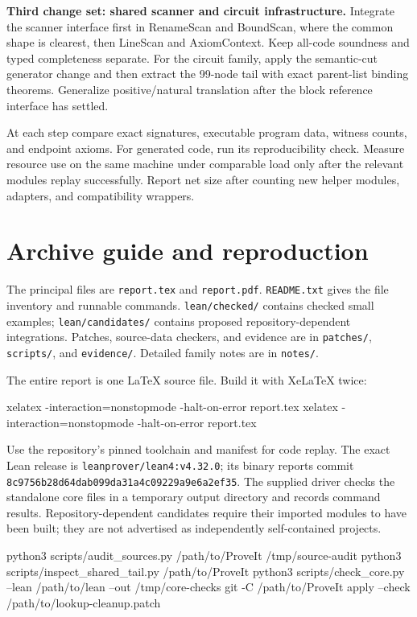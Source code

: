\documentclass[11pt,letterpaper]{article}
\newcommand{\code}[1]{\nolinkurl{#1}}
\begin{document}
\textbf{Third change set: shared scanner and circuit infrastructure.}
Integrate the scanner interface first in RenameScan and BoundScan, where the
common shape is clearest, then LineScan and AxiomContext. Keep all-code
soundness and typed completeness separate. For the circuit family, apply the
semantic-cut generator change and then extract the 99-node tail with exact
parent-list binding theorems. Generalize positive/natural translation after
the block reference interface has settled.

At each step compare exact signatures, executable program data, witness counts,
and endpoint axioms. For generated code, run its reproducibility check. Measure
resource use on the same machine under comparable load only after the relevant
modules replay successfully. Report net size after counting new helper modules,
adapters, and compatibility wrappers.

\appendix
\section{Archive guide and reproduction}

The principal files are \code{report.tex} and \code{report.pdf}.
\code{README.txt} gives the file inventory and runnable commands.
\code{lean/checked/} contains checked small examples; \code{lean/candidates/}
contains proposed repository-dependent integrations. Patches, source-data
checkers, and evidence are in \code{patches/}, \code{scripts/}, and
\code{evidence/}. Detailed family notes are in \code{notes/}.

The entire report is one LaTeX source file. Build it with XeLaTeX twice:

\begin{Lean}
xelatex -interaction=nonstopmode -halt-on-error report.tex
xelatex -interaction=nonstopmode -halt-on-error report.tex
\end{Lean}

Use the repository's pinned toolchain and manifest for code replay. The exact
Lean release is \code{leanprover/lean4:v4.32.0}; its binary reports commit
\code{8c9756b28d64dab099da31a4c09229a9e6a2ef35}.
The supplied driver checks the standalone core files in a temporary output
directory and records command results. Repository-dependent candidates require
their imported modules to have been built; they are not advertised as
independently self-contained projects.

\begin{Lean}
python3 scripts/audit_sources.py /path/to/ProveIt /tmp/source-audit
python3 scripts/inspect_shared_tail.py /path/to/ProveIt
python3 scripts/check_core.py --lean /path/to/lean --out /tmp/core-checks
git -C /path/to/ProveIt apply --check /path/to/lookup-cleanup.patch
\end{Lean}
\end{document}
